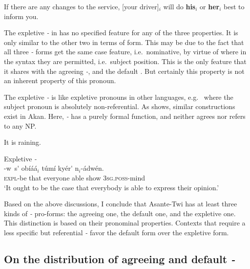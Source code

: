\documentclass[output=paper]{LSP/langsci}
\begin{document}
\ex\label{ex:korsah:25b} 
If there are any changes to the service, [your driver]$_i$ will do \textbf{his}$_i$ or \textbf{her}$_i$ best to inform you.

\z
\z

 

 
The expletive \textit{\eer-} in  has no specified feature for any of the three properties. It is only similar to the other two in terms of form. This may be due to the fact that all three \textit{\eer-} forms get the same case feature, i.e.\ nominative, by virtue of where in the syntax they are permitted, i.e.\ subject position. This is the only feature that it shares with the agreeing \textit{\eer-}, and the default \textit{\eer}. But certainly this property is not an inherent property of this pronoun. 
 
 
The expletive \textit{\eer-} is like expletive pronouns in other languages, e.g.\  where the subject pronoun is absolutely non-referential. As  shows, similar constructions exist in Akan. Here, \textit{\eer-} has a purely formal function, and neither agrees nor refers to any NP.
 
 
 \ea\label{ex:korsah:26} 
 It is raining.

\z

 
\ea\label{ex:korsah:27} Expletive \textit{\eer-}\\
 
\gll \scalebox{1.5}{\eer}-w\oor \, s{\'{\eer}}  ob{\'{i}}{\'{a}}{\'{a}}$_i$ t{\'{u}}m{\'{i}} ky{\'{e}}r{\'{\eer}} n$_i$-{\'{a}}dw{\'{e}}n. \\
\textsc{expl}-be that everyone  able show \textsc{3sg.poss}-mind \hfill \\
\glt  `It ought to be the case that everybody is able to express their opinion.'

\z

 
Based on the above discussions, I conclude  that Asante-Twi has at least three kinds of \textit{\eer-} pro-forms: the agreeing one, the default one, and the expletive one. This distinction is based on their pronominal properties. Contexts that require a less specific but referential \textit{\eer-} favor the default form over the expletive form. 

 
\subsection{On the distribution of agreeing and default  \textit{\eer-} } \label{sec:korsah:4.2}
  
\end{document}
